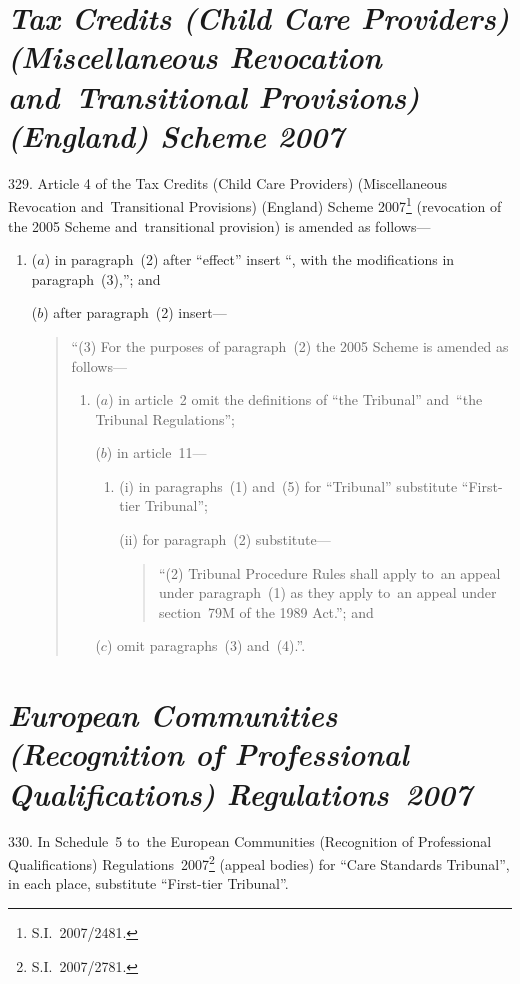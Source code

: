 \documentclass[12pt,a4paper]{article}
\begin{document}
\section*{\itshape Tax Credits (Child Care Providers) (Miscellaneous Revocation and~Transitional Provisions) (England) Scheme 2007}

329.  Article 4 of the Tax Credits (Child Care Providers) (Miscellaneous Revocation and~Transitional Provisions) (England) Scheme 2007\footnote{S.I.~2007/2481.} (revocation of the 2005 Scheme and~transitional provision) is amended as follows—
\begin{enumerate}\item[]
($a$) in paragraph~(2) after “effect” insert “, with the modifications in paragraph~(3),”; and

($b$) after paragraph~(2) insert—
\begin{quotation}
“(3) For the purposes of paragraph~(2) the 2005 Scheme is amended as follows—
\begin{enumerate}\item[]
($a$) in article~2 omit the definitions of “the Tribunal” and~“the Tribunal Regulations”;

($b$) in article~11—
\begin{enumerate}\item[]
(i) in paragraphs~(1) and~(5) for “Tribunal” substitute “First-tier Tribunal”;

(ii) for paragraph~(2) substitute—
\begin{quotation}
“(2) Tribunal Procedure Rules shall apply to~an appeal under paragraph~(1) as they apply to~an appeal under section~79M of the 1989 Act.”; and
\end{quotation}
\end{enumerate}

($c$) omit paragraphs~(3) and~(4).”.
\end{enumerate}
\end{quotation}
\end{enumerate}

\section*{\itshape European Communities (Recognition of Professional Qualifications) Regulations~2007}

330.  In Schedule~5 to~the European Communities (Recognition of Professional Qualifications) Regulations~2007\footnote{S.I.~2007/2781.} (appeal bodies) for “Care Standards Tribunal”, in each place, substitute “First-tier Tribunal”.
\end{document}
